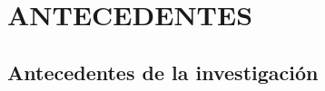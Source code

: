 \documentclass[
  a4paper]{article}
\begin{document}
\begin{table}[ht]
\begin{center}
\begin{tabular}{>{\centering}m{2.4cm} m{2.2cm}m{2.2cm}m{1.8cm}m{2cm}m{1.7cm}m{1.5cm}m{1.6cm} @{}m{0pt}@{} }


\end{tabular}
\hspace*{-1cm}
\end{center}
\end{table}

\hypertarget{antecedentes}{%
\section{ANTECEDENTES}\label{antecedentes}}

\hypertarget{antecedentes-de-la-investigaciuxf3n}{%
\subsection{Antecedentes de la
investigación}\label{antecedentes-de-la-investigaciuxf3n}}
\end{document}
